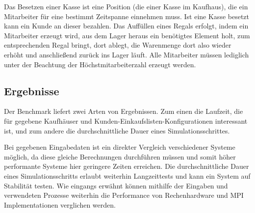 Das Besetzen einer Kasse ist eine Position (die einer Kasse im Kaufhaus), die ein Mitarbeiter für eine bestimmt Zeitspanne einnehmen muss. Ist eine Kasse besetzt kann ein Kunde an dieser bezahlen. Das Auffüllen eines Regals erfolgt, indem ein Mitarbeiter erzeugt wird, aus dem Lager heraus ein benötigtes Element holt, zum entsprechenden Regal bringt, dort ablegt, die Warenmenge dort also wieder erhöht und anschließend zurück ins Lager läuft. Alle Mitarbeiter müssen lediglich unter der Beachtung der Höchstmitarbeiterzahl erzeugt werden.

\subsection{Ergebnisse}
Der Benchmark liefert zwei Arten von Ergebnissen. Zum einen die Laufzeit, die für gegebene Kaufhäuser und Kunden-Einkaufslisten-Konfigurationen interessant ist, und zum andere die durchschnittliche Dauer eines Simulationsschrittes.

Bei gegebenen Eingabedaten ist ein direkter Vergleich verschiedener Systeme möglich, da diese gleiche Berechnungen durchführen müssen und somit höher performante Systeme hier geringere Zeiten erreichen.
Die durchschnittliche Dauer eines Simulationsschritts erlaubt weiterhin Langzeittests und kann ein System auf Stabilität testen.
Wie eingangs erwähnt können mithilfe der Eingaben und verwendeten Prozesse weiterhin die Performance von Rechenhardware und MPI Implementationen verglichen werden.